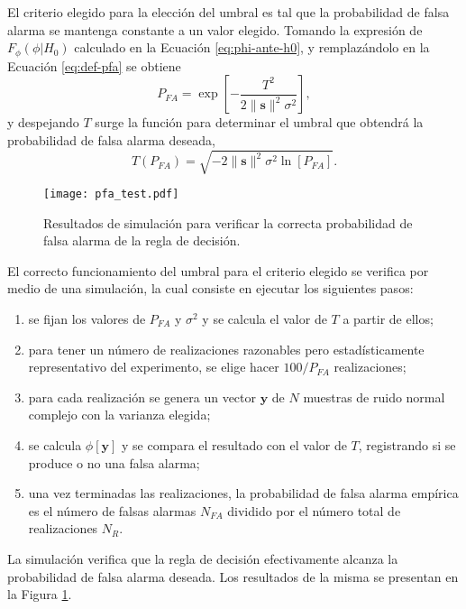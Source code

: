El criterio elegido para la elección del umbral es tal que la probabilidad de falsa alarma se mantenga constante a un valor elegido. Tomando la expresión de $F_\phi(\phi|H_0)$ calculado en la Ecuación \ref{eq:phi-ante-h0}, y remplazándolo en la Ecuación \ref{eq:def-pfa} se obtiene
\begin{equation}
    P_{FA} = \exp\left[-\frac{T^2}{2\lVert\mathbf{s}\rVert^2 \sigma^2}\right],    
\end{equation}
y despejando $T$ surge la función para determinar el umbral que obtendrá la probabilidad de falsa alarma deseada,
\begin{equation}\label{eq:umbral}
    T(P_{FA}) = \sqrt{-2\lVert \mathbf{s}\rVert^2 \sigma^2 \ln\left[P_{FA}\right]}.
\end{equation}

\begin{figure}[t]
    \centering{}\texttt{[image: pfa\_test.pdf]}
    \caption{Resultados de simulación para verificar la correcta probabilidad de falsa alarma de la regla de decisión.\label{fig:pfa-test}}  
\end{figure}

El correcto funcionamiento del umbral para el criterio elegido se verifica por medio de una simulación, la cual consiste en ejecutar los siguientes pasos:
\begin{enumerate}
    \item se fijan los valores de $P_{FA}$ y $\sigma^2$ y se calcula el valor de $T$ a partir de ellos;
    \item para tener un número de realizaciones razonables pero estadísticamente representativo del experimento, se elige hacer $100/P_{FA}$ realizaciones;
    \item para cada realización se genera un vector $\mathbf{y}$ de $N$ muestras de ruido normal complejo con la varianza elegida; 
    \item se calcula $\phi[\mathbf{y}]$ y se compara el resultado con el valor de $T$, registrando si se produce o no una falsa alarma;
    \item una vez terminadas las realizaciones, la probabilidad de falsa alarma empírica es el número de falsas alarmas $N_{FA}$ dividido por el número total de realizaciones $N_R$.
\end{enumerate}
La simulación verifica que la regla de decisión efectivamente alcanza la probabilidad de falsa alarma deseada. Los resultados de la misma se presentan en la Figura \ref{fig:pfa-test}.

